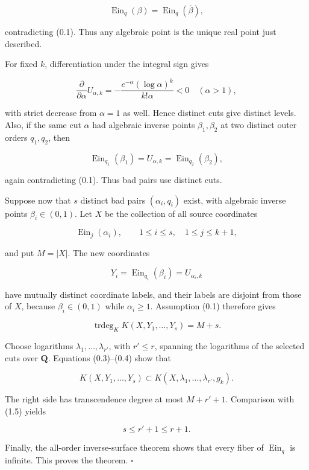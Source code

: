 \documentclass[11pt]{article}
\theoremstyle{keio}
\theoremstyle{definition}
\theoremstyle{remark}
\begin{document}
\[
 \operatorname{Ein}_q(\beta)
 =\operatorname{Ein}_q(\overline\beta),
\]

contradicting (0.1). Thus any algebraic point is the unique real point just
described.

For fixed \(k\), differentiation under the integral sign gives

\[
 \frac{\partial}{\partial\alpha}U_{\alpha,k}
 =-\frac{e^{-\alpha}(\log\alpha)^k}{k!\alpha}<0
 \quad(\alpha>1),                                             \tag{GS-1.4}
\]

with strict decrease from \(\alpha=1\) as well. Hence distinct cuts give
distinct levels. Also, if the same cut \(\alpha\) had algebraic inverse
points \(\beta_1,\beta_2\) at two distinct outer orders \(q_1,q_2\), then

\[
 \operatorname{Ein}_{q_1}(\beta_1)
 =U_{\alpha,k}
 =\operatorname{Ein}_{q_2}(\beta_2),
\]

again contradicting (0.1). Thus bad pairs use distinct cuts.

Suppose now that \(s\) distinct bad pairs
\((\alpha_i,q_i)\) exist, with algebraic inverse points
\(\beta_i\in(0,1)\). Let \(X\) be the collection of all source coordinates

\[
 \operatorname{Ein}_j(\alpha_i),
 \qquad 1\leq i\leq s,\quad1\leq j\leq k+1,
\]

and put \(M=|X|\). The new coordinates

\[
 Y_i=\operatorname{Ein}_{q_i}(\beta_i)=U_{\alpha_i,k}
\]

have mutually distinct coordinate labels, and their labels are disjoint
from those of \(X\), because \(\beta_i\in(0,1)\) while
\(\alpha_i\geq1\). Assumption (0.1) therefore
gives

\[
 \operatorname{trdeg}_K K(X,Y_1,\ldots,Y_s)=M+s.              \tag{GS-1.5}
\]

Choose logarithms \(\lambda_1,\ldots,\lambda_{r'}\), with
\(r'\leq r\), spanning the logarithms of the selected cuts over
\(\mathbf Q\). Equations (0.3)--(0.4) show that

\[
 K(X,Y_1,\ldots,Y_s)
 \subset K(X,\lambda_1,\ldots,\lambda_{r'},g_k).
\]

The right side has transcendence degree at most \(M+r'+1\). Comparison
with (1.5) yields

\[
 s\leq r'+1\leq r+1.                                         \tag{GS-1.6}
\]

Finally, the all-order inverse-surface theorem shows that every fiber of
\(\operatorname{Ein}_q\) is infinite. This proves the theorem. \(\square\)
\end{document}
